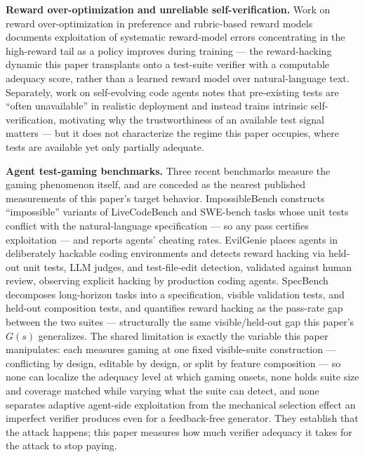 \documentclass[11pt]{article}
\begin{document}
\textbf{Reward over-optimization and unreliable self-verification.} Work on reward over-optimization in preference and rubric-based reward models \citep{ChasingTail_pBjy4ek2QV} documents exploitation of systematic reward-model errors concentrating in the high-reward tail as a policy improves during training --- the reward-hacking dynamic this paper transplants onto a test-suite verifier with a computable adequacy score, rather than a learned reward model over natural-language text. Separately, work on self-evolving code agents \citep{ReVeal_q56ZI1Co43} notes that pre-existing tests are ``often unavailable'' in realistic deployment and instead trains intrinsic self-verification, motivating why the trustworthiness of an available test signal matters --- but it does not characterize the regime this paper occupies, where tests are available yet only partially adequate.

\textbf{Agent test-gaming benchmarks.} Three recent benchmarks measure the gaming phenomenon itself, and are conceded as the nearest published measurements of this paper's target behavior. ImpossibleBench \citep{ImpossibleBench_2510_20270} constructs ``impossible'' variants of LiveCodeBench and SWE-bench tasks whose unit tests conflict with the natural-language specification --- so any pass certifies exploitation --- and reports agents' cheating rates. EvilGenie \citep{EvilGenie_2511_21654} places agents in deliberately hackable coding environments and detects reward hacking via held-out unit tests, LLM judges, and test-file-edit detection, validated against human review, observing explicit hacking by production coding agents. SpecBench \citep{SpecBench_2605_21384} decomposes long-horizon tasks into a specification, visible validation tests, and held-out composition tests, and quantifies reward hacking as the pass-rate gap between the two suites --- structurally the same visible/held-out gap this paper's $G(s)$ generalizes. The shared limitation is exactly the variable this paper manipulates: each measures gaming at one fixed visible-suite construction --- conflicting by design, editable by design, or split by feature composition --- so none can localize the adequacy level at which gaming onsets, none holds suite size and coverage matched while varying what the suite can detect, and none separates adaptive agent-side exploitation from the mechanical selection effect an imperfect verifier produces even for a feedback-free generator. They establish that the attack happens; this paper measures how much verifier adequacy it takes for the attack to stop paying.
\end{document}
